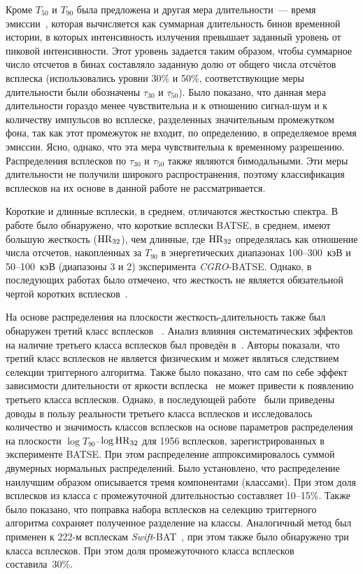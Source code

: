 Кроме $T_{50}$ и $T_{90}$ была предложена и другая мера длительности~--- время 
эмиссии~\citep{Mitrofanov_1999}, которая вычисляется как суммарная длительность 
бинов временной истории, в которых интенсивность излучения превышает заданный 
уровень от пиковой интенсивности. Этот уровень задается таким образом, чтобы 
суммарное число отсчетов в бинах составляло заданную долю от общего числа отсчётов 
всплеска (использовались уровни 30\% и 50\%, соответствующие меры длительности 
были обозначены $\tau_{30}$ и $\tau_{50}$). Было показано, что данная мера 
длительности гораздо менее чувствительна и к отношению сигнал-шум и к количеству 
импульсов во всплеске, разделенных значительным промежутком фона, так как этот 
промежуток не входит, по определению, в определяемое время эмиссии. Ясно, однако, 
что эта мера чувствительна к временному разрешению. Распределения всплесков 
по $\tau_{30}$ и $\tau_{50}$  также являются бимодальными. Эти меры длительности 
не получили широкого распространения, поэтому классификация всплесков 
на их основе в данной работе не рассматривается. 

Короткие и длинные всплески, в среднем, отличаются жесткостью спектра.
В работе \citep{Kouveliotou_1993} было обнаружено, что короткие всплески BATSE, в 
среднем, имеют большую жесткость (${\mathrm{HR}}_{32}$), чем длинные, где ${\mathrm{HR}}_{32}$ определялась 
как отношение числа отсчетов, накопленных за $T_{90}$ в энергетических 
диапазонах 100--300~кэВ и 50--100~кэВ (диапазоны 3 и 2) эксперимента \textit{CGRO}-BATSE. 
Однако, в последующих работах было отмечено, что жесткость не является обязательной чертой 
коротких всплесков~\citep[см. например][]{Sakamoto_2006_proc, Norris_and_Bonnel_2006ApJ}. 

На основе распределения на плоскости жесткость-длительность также был обнаружен 
третий класс всплесков ~\citep{Mukherjee_1998, Hakkila_2000}. Анализ влияния 
систематических эффектов на наличие третьего класса всплесков был проведён 
в~\citep{Hakkila_2003}. Авторы показали, что третий класс всплесков не является 
физическим и может являться следствием селекции триггерного алгоритма. Также было 
показано, что сам по себе эффект зависимости длительности от яркости 
всплеска~\citep{Bonnell_1997} не может привести к появлению третьего класса всплесков. 
Однако, в последующей работе~\citep{Horvath_2006} были приведены доводы в пользу 
реальности третьего класса всплесков и исследовалось количество и значимость 
классов всплесков на основе параметров распределения на плоскости 
$\log T_{90}$--$\log {\mathrm{HR}}_{32}$ для 1956 всплесков, зарегистрированных 
в эксперименте BATSE. При этом распределение аппроксимировалось 
суммой двумерных нормальных распределений. Было установлено, что распределение 
наилучшим образом описывается тремя компонентами (классами). При этом доля всплесков 
из класса с промежуточной длительностью составляет 10--15\%. Также было показано, что поправка набора 
всплесков на селекцию триггерного алгоритма сохраняет полученное разделение на классы. 
Аналогичный метод был применен к 222-м всплескам \textit{Swift}-BAT~\citep{Horvath_2010}, 
при этом также было обнаружено три класса всплесков. При этом доля промежуточного 
класса всплесков составила~30\%.

